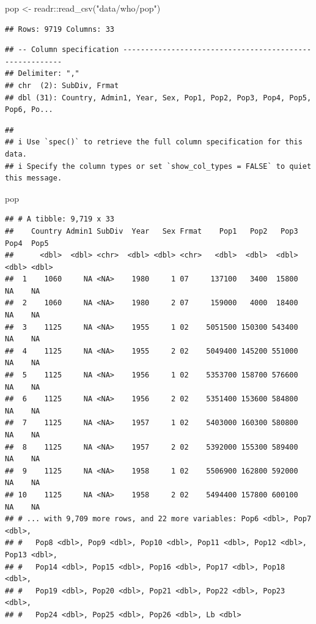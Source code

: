 \documentclass[
]{book}
\newenvironment{Shaded}{\begin{snugshade}}{\end{snugshade}}
\newcommand{\FunctionTok}[1]{\textcolor[rgb]{0.00,0.00,0.00}{#1}}
\newcommand{\NormalTok}[1]{#1}
\newcommand{\OtherTok}[1]{\textcolor[rgb]{0.56,0.35,0.01}{#1}}
\newcommand{\SpecialCharTok}[1]{\textcolor[rgb]{0.00,0.00,0.00}{#1}}
\newcommand{\StringTok}[1]{\textcolor[rgb]{0.31,0.60,0.02}{#1}}
\begin{document}
\begin{Shaded}
\begin{Highlighting}[]
\NormalTok{pop }\OtherTok{\textless{}{-}}\NormalTok{ readr}\SpecialCharTok{::}\FunctionTok{read\_csv}\NormalTok{(}\StringTok{"data/who/pop"}\NormalTok{)}
\end{Highlighting}
\end{Shaded}

\begin{verbatim}
## Rows: 9719 Columns: 33
\end{verbatim}

\begin{verbatim}
## -- Column specification --------------------------------------------------------
## Delimiter: ","
## chr  (2): SubDiv, Frmat
## dbl (31): Country, Admin1, Year, Sex, Pop1, Pop2, Pop3, Pop4, Pop5, Pop6, Po...
\end{verbatim}

\begin{verbatim}
## 
## i Use `spec()` to retrieve the full column specification for this data.
## i Specify the column types or set `show_col_types = FALSE` to quiet this message.
\end{verbatim}

\begin{Shaded}
\begin{Highlighting}[]
\NormalTok{pop}
\end{Highlighting}
\end{Shaded}

\begin{verbatim}
## # A tibble: 9,719 x 33
##    Country Admin1 SubDiv  Year   Sex Frmat    Pop1   Pop2   Pop3  Pop4  Pop5
##      <dbl>  <dbl> <chr>  <dbl> <dbl> <chr>   <dbl>  <dbl>  <dbl> <dbl> <dbl>
##  1    1060     NA <NA>    1980     1 07     137100   3400  15800    NA    NA
##  2    1060     NA <NA>    1980     2 07     159000   4000  18400    NA    NA
##  3    1125     NA <NA>    1955     1 02    5051500 150300 543400    NA    NA
##  4    1125     NA <NA>    1955     2 02    5049400 145200 551000    NA    NA
##  5    1125     NA <NA>    1956     1 02    5353700 158700 576600    NA    NA
##  6    1125     NA <NA>    1956     2 02    5351400 153600 584800    NA    NA
##  7    1125     NA <NA>    1957     1 02    5403000 160300 580800    NA    NA
##  8    1125     NA <NA>    1957     2 02    5392000 155300 589400    NA    NA
##  9    1125     NA <NA>    1958     1 02    5506900 162800 592000    NA    NA
## 10    1125     NA <NA>    1958     2 02    5494400 157800 600100    NA    NA
## # ... with 9,709 more rows, and 22 more variables: Pop6 <dbl>, Pop7 <dbl>,
## #   Pop8 <dbl>, Pop9 <dbl>, Pop10 <dbl>, Pop11 <dbl>, Pop12 <dbl>, Pop13 <dbl>,
## #   Pop14 <dbl>, Pop15 <dbl>, Pop16 <dbl>, Pop17 <dbl>, Pop18 <dbl>,
## #   Pop19 <dbl>, Pop20 <dbl>, Pop21 <dbl>, Pop22 <dbl>, Pop23 <dbl>,
## #   Pop24 <dbl>, Pop25 <dbl>, Pop26 <dbl>, Lb <dbl>
\end{verbatim}
\end{document}
